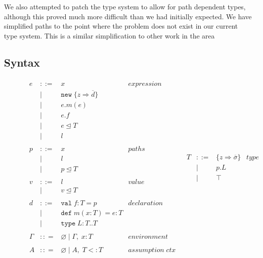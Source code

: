 \documentclass[11pt
              , a4paper
              , twoside
              , openright
              ]{report}
\numberwithin{case}{theorem}
\numberwithin{subcase}{case}
\begin{document}
We also attempted to patch the type system to allow for path dependent types, although this proved much more difficult than we had initially expected. We have simplified paths to the point where the problem does not exist in our current type system. This is a similar simplification to other work in the area \cite{amin:fool:2012, Amin:2014:FPT:2660193.2660216}

\subsection{Syntax} \label{s:syntax}
\begin{figure}[t]
\[
\begin{array}{lll}
\begin{array}{lllr}
e & ::= & x & expression \\
& | & \texttt{new} \; \{z \Rightarrow \overline{d}\}&\\
& | & e.m(e) &\\
& | & e.f &\\
& | & e \unlhd T&\\
& | & l &\\
&&\\
p & ::= & x & paths \\
& | & l &\\
& | & p \unlhd T &\\
&&\\
v & ::= & l & value \\
& | & v \unlhd T &\\
&&\\
d & ::= & \texttt{val} \; f : T = p & declaration \\
  & |   & \texttt{def} \; m(x:T) = e : T &\\
  & |   & \texttt{type} \; L : T .. T&\\
&&\\
\Gamma & :: = & \varnothing \; | \; \Gamma,\; x : T & environment \\
&&\\
A & :: = & \varnothing \; | \; A,\; T <: T & assumption \; ctx \\
 \end{array}
&
\begin{array}{lllr}
T & ::= & \{z \Rightarrow \overline{\sigma}\} & type \\
& | & p.L &\\
& | & \top & \\

\end{array}
\end{array}\]
\end{figure}
\end{document}
